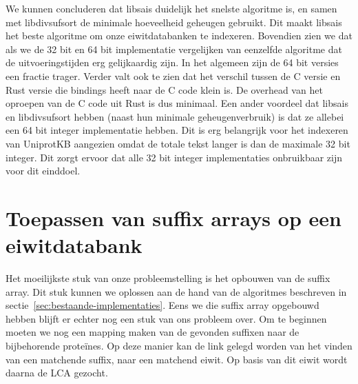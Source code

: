 We kunnen concluderen dat libsais duidelijk het snelste algoritme is, en samen met libdivsufsort de minimale hoeveelheid geheugen gebruikt.
Dit maakt libsais het beste algoritme om onze eiwitdatabanken te indexeren.
Bovendien zien we dat als we de 32 bit en 64 bit implementatie vergelijken van eenzelfde algoritme dat de uitvoeringstijden erg gelijkaardig zijn.
In het algemeen zijn de 64 bit versies een fractie trager.
Verder valt ook te zien dat het verschil tussen de C versie en Rust versie die bindings heeft naar de C code klein is.
De overhead van het oproepen van de C code uit Rust is dus minimaal.
Een ander voordeel dat libsais en libdivsufsort hebben (naast hun minimale geheugenverbruik) is dat ze allebei een 64 bit integer implementatie hebben.
Dit is erg belangrijk voor het indexeren van UniprotKB aangezien omdat de totale tekst langer is dan de maximale 32 bit integer.
Dit zorgt ervoor dat alle 32 bit integer implementaties onbruikbaar zijn voor dit einddoel.


\section{Toepassen van suffix arrays op een eiwitdatabank}\label{sec:toepassen-van-suffix-arrays-op-een-eiwitdatabank}
Het moeilijkste stuk van onze probleemstelling is het opbouwen van de suffix array.
Dit stuk kunnen we oplossen aan de hand van de algoritmes beschreven in sectie~\ref{sec:bestaande-implementaties}.
Eens we die suffix array opgebouwd hebben blijft er echter nog een stuk van ons probleem over.
Om te beginnen moeten we nog een mapping maken van de gevonden suffixen naar de bijbehorende proteïnes.
Op deze manier kan de link gelegd worden van het vinden van een matchende suffix, naar een matchend eiwit.
Op basis van dit eiwit wordt daarna de LCA gezocht.

